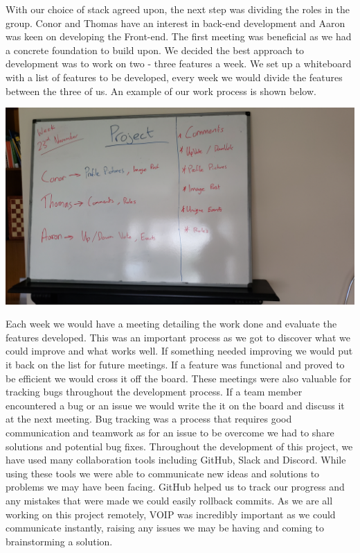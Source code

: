 \begin{itemize}
With our choice of stack agreed upon, the next step was dividing the roles in the group. Conor and Thomas have an interest in back-end development and Aaron was keen on developing the Front-end. The first meeting was beneficial as we had a concrete foundation to build upon. \newline
We decided the best approach to development was to work on two - three features a week. We set up a whiteboard with a list of features to be developed, every week we would divide the features between the three of us. An example of our work process is shown below.
\begin{center}
  \includegraphics[scale=0.09]{img/whiteboard.jpg}
\end{center}
Each week we would have a meeting detailing the work done and evaluate the features developed. This was an important process as we got to discover what we could improve and what works well. If something needed improving we would put it back on the list for future meetings. If a feature was functional and proved to be efficient we would cross it off the board. \newline
These meetings were also valuable for tracking bugs throughout the development process. If a team member encountered a bug or an issue we would write the it on the board and discuss it at the next meeting. Bug tracking was a process that requires good communication and teamwork as for an issue to be overcome we had to share solutions and potential bug fixes. 
\newline
Throughout the development of this project, we have used many collaboration tools including GitHub, Slack and Discord. While using these tools we were able to communicate new ideas and solutions to problems we may have been facing. GitHub helped us to track our progress and any mistakes that were made we could easily rollback commits. As we are all working on this project remotely, VOIP was incredibly important as we could communicate instantly, raising any issues we may be having and coming to brainstorming a solution.


\end{itemize}
